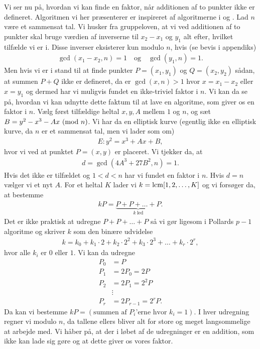Vi ser nu på, hvordan vi kan finde en faktor, når additionen af to punkter ikke er defineret. Algoritmen vi her præsenterer er inspireret af algoritmerne i \cite{Silverman} og \cite{Washington}. Lad $n$ være et sammensat tal. Vi husker fra gruppeloven, at vi ved additionen af to punkter skal bruge værdien af inverserne til $x_2 - x_1$ og $y_1$ alt efter, hvilket tilfælde vi er i. Disse inverser eksisterer kun modulo $n$, hvis (se bevis i appendiks)
\begin{align*}
	\gcd(x_1 - x_2, n) = 1 \quad \text{og} \quad \gcd(y_1, n) = 1.
\end{align*}
Men hvis vi er i stand til at finde punkter $P=(x_1, y_1)$ og $Q=(x_2, y_2)$ sådan, at summen $P+Q$ ikke er defineret, da er $\gcd(x, n) > 1$ hvor $x=x_1-x_2$ eller $x=y_1$ og dermed har vi muligvis fundet en ikke-triviel faktor i $n$. Vi kan da se på, hvordan vi kan udnytte dette faktum til at lave en algoritme, som giver os en faktor i $n$. Vælg først tilfældige heltal $x, y, A$ mellem $1$ og $n$, og sæt $B = y^2 - x^3 - Ax \ (\mathrm{mod} \ n)$. Vi har da en elliptisk kurve (egentlig ikke en elliptisk kurve, da $n$ er et sammensat tal, men vi lader som om)
\begin{align*}
	E : y^2 = x^3 + Ax + B,
\end{align*}
hvor vi ved at punktet $P=(x, y)$ er placeret. Vi tjekker da, at
\begin{align*}
	d= \gcd(4A^3 + 27B^2, n) = 1.
\end{align*}
Hvis det ikke er tilfældet og $1 < d < n$ har vi fundet en faktor i $n$. Hvis $d = n$ vælger vi et nyt $A$. For et heltal $K$ lader vi $k=\mathrm{lcm}[1, 2, \ldots, K]$ og vi forsøger da, at bestemme
\begin{align*}
	kP = \underbrace{P + P + \ldots + P}_{k \ \text{led}}.
\end{align*}
Det er ikke praktisk at udregne $P+P+ \ldots + P$ så vi gør ligesom i Pollards $p-1$ algoritme og skriver $k$ som den binære udvidelse
\begin{align*}
	k = k_0 + k_1 \cdot 2 + k_2 \cdot 2^2 + k_ 3 \cdot 2^3 + \ldots + k_r \cdot 2^r,
\end{align*}
hvor alle $k_i$ er $0$ eller $1$. Vi kan da udregne
\begin{align*}
	P_0 &= P \\
	P_1 &= 2P_0 = 2P \\
	P_2 &= 2P_1 = 2^2 P \\
	&\vdots \\
	P_r &= 2 P_{r-1} = 2^r P.
\end{align*}
Da kan vi bestemme $kP= (\text{summen af $P_i$'erne hvor $k_i = 1$})$. I hver udregning regner vi modulo $n$, da tallene ellers bliver alt for store og meget langsommelige at arbejde med. Vi håber på, at der i løbet af de udregninger er en addition, som ikke kan lade sig gøre og at dette giver os vores faktor. 


